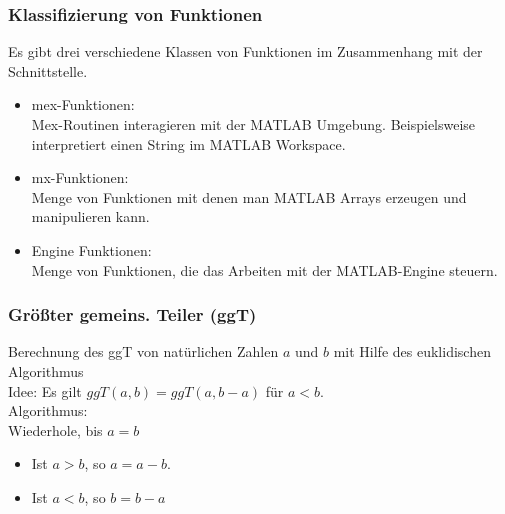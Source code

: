 %
% 
\begin{frame}[fragile]\frametitle{Klassifizierung von Funktionen}
\vspace*{-0.5cm}
Es gibt drei verschiedene Klassen von Funktionen im Zusammenhang mit der Schnittstelle.
\begin{itemize}
\item \alert\alert{ mex-Funktionen:}\\
 Mex-Routinen interagieren mit der MATLAB Umgebung. 
Beispielsweise interpretiert  einen String im MATLAB Workspace.  
\item \alert\alert{ mx-Funktionen:} \\
Menge von Funktionen mit 
 denen man MATLAB Arrays erzeugen und manipulieren kann. 
\item \alert\alert{ Engine Funktionen:}\\ 
 Menge von Funktionen, die das Arbeiten mit der MATLAB-Engine steuern. 
\end{itemize}
\end{frame}
%
%
%
\begin{frame}[fragile]\frametitle{Gr\"o{\ss}ter gemeins. Teiler (ggT)}
Berechnung des ggT von nat\"urlichen Zahlen $a$ und $b$ mit Hilfe des
euklidischen Algorithmus\\[1cm]

\alert{Idee:} Es gilt \alert{ $ggT(a,b)=ggT(a,b-a)$} f\"ur $a<b$.\\[1cm]

\alert{Algorithmus:} \\
Wiederhole,  bis $a=b$
\begin{itemize}
\item Ist $a>b$, so $a=a-b$.
\item Ist $a<b$, so $b=b-a$ 
\end{itemize}
\end{frame}

